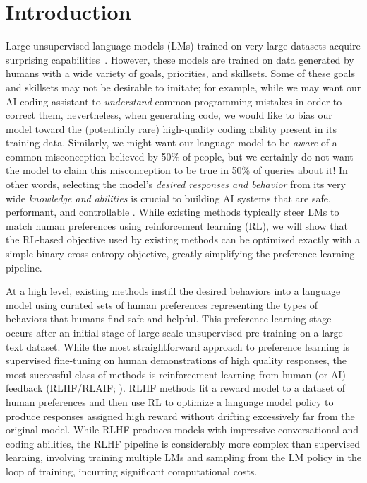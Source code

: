 \section{Introduction}
Large unsupervised language models (LMs) trained on very large datasets
acquire surprising capabilities~\citep{chowdhery2022palm, brown2020language, touvron2023llama,bubeck2023sparks}. However, these models are trained on data generated by humans with a wide variety of goals, priorities, and skillsets. Some of these goals and skillsets may not be desirable to imitate; for example, while we may want our AI coding assistant to \textit{understand} common programming mistakes in order to correct them, nevertheless, when generating code, we would like to bias our model toward the (potentially rare) high-quality coding ability present in its training data. Similarly, we might want our language model to be \textit{aware} of a common misconception believed by 50\% of people, but we certainly do not want the model to claim this misconception to be true in 50\% of queries about it! In other words, selecting the model's \emph{desired responses and behavior} from its very wide \textit{knowledge and abilities} is crucial to building AI systems that are safe, performant, and controllable \citep{ouyang2022training}. While existing methods typically steer LMs to match human preferences using reinforcement learning (RL), we will show that the RL-based objective used by existing methods can be optimized exactly with a simple binary cross-entropy objective, greatly simplifying the preference learning pipeline.




At a high level, existing methods instill the desired behaviors into a language model using curated sets of human preferences representing the types of behaviors that humans find safe and helpful. This preference learning stage occurs after an initial stage of large-scale unsupervised pre-training on a large text dataset. While the most straightforward approach to preference learning is supervised fine-tuning on human demonstrations of high quality responses, the most successful class of methods is reinforcement learning from human (or AI) feedback (RLHF/RLAIF; \citep{christiano2017deep,bai2022constitutional}). RLHF methods fit a reward model to a dataset of human preferences and then use RL to optimize a language model policy to produce responses assigned high reward without drifting excessively far from the original model. While RLHF produces models with impressive conversational and coding abilities, the RLHF pipeline is considerably more complex than supervised learning, involving training multiple LMs and sampling from the LM policy in the loop of training, incurring significant computational costs.

